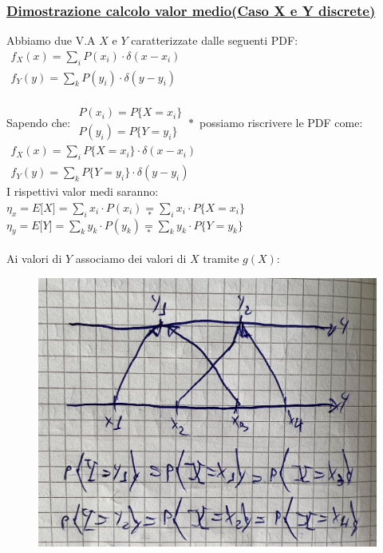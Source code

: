\documentclass{article}
\begin{document}
\subsubsection{\underline{Dimostrazione calcolo valor medio(Caso X e Y discrete)}}
Abbiamo due V.A $X$ e $Y$ caratterizzate dalle seguenti PDF: $\begin{matrix}
f_X(x) = \sum_{i} P(x_i) \cdot \delta(x-x_i) \\
f_Y(y) = \sum_{k} P(y_i) \cdot \delta(y-y_i)
\end{matrix}$ \\ \\
Sapendo che: $\begin{matrix}
P(x_i) = P\big\{ X = x_i\big\} \\
P(y_i) = P\big\{ Y = y_i\big\}
\end{matrix}*$ possiamo riscrivere le PDF come: $\begin{matrix}
f_X(x) = \sum_{i} P\big\{ X = x_i\big\} \cdot \delta(x-x_i) \\
f_Y(y) = \sum_{k} P\big\{ Y = y_i\big\} \cdot \delta(y-y_i)
\end{matrix}$ \\
I rispettivi valor medi saranno: \\
$\eta_x = E\big[ X \big] = \sum_{i} x_i \cdot P(x_i) \underset{*}{=} \sum_{i} x_i \cdot P\big\{ X=x_i\big\}$ \\
$\eta_y = E\big[ Y \big] = \sum_{k} y_k \cdot P(y_k) \underset{*}{=} \sum_{k} y_k \cdot P\big\{ Y=y_k\big\}$ \\ \\
Ai valori di $Y$ associamo dei valori di $X$ tramite $g(X)$: \\
\begin{figure}[ht]
\centering
\includegraphics[scale=0.13]{images/48.DimTeoAsp.jpeg}
\end{figure} \\
\end{document}
